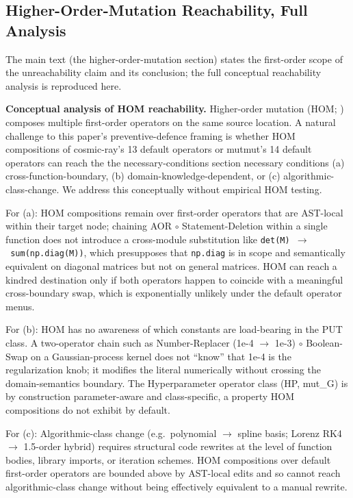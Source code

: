 \documentclass[manuscript,screen,review]{acmart}
\begin{document}
\subsection{Higher-Order-Mutation Reachability, Full Analysis}\label{k.3-hom-reachability}

The main text (the higher-order-mutation section) states the
first-order scope of the unreachability claim and its conclusion; the full
conceptual reachability analysis is reproduced here.

\textbf{Conceptual analysis of HOM reachability.} Higher-order mutation
(HOM; \citealp{jia2008subtle,jia2009hom,kintis2018effective}) composes multiple
first-order operators on the same source location. A natural challenge to this
paper's preventive-defence framing is whether HOM compositions of cosmic-ray's
13 default operators or mutmut's 14 default operators can reach the
the necessary-conditions section necessary
conditions (a) cross-function-boundary, (b) domain-knowledge-dependent, or (c)
algorithmic-class-change. We address this conceptually without empirical HOM
testing.

For (a): HOM compositions remain over first-order operators that are AST-local
within their target node; chaining AOR $\circ$ Statement-Deletion within a single
function does not introduce a cross-module substitution like
\texttt{det(M)\ $\to$\ sum(np.diag(M))}, which presupposes that \texttt{np.diag}
is in scope and semantically equivalent on diagonal matrices but not on general
matrices. HOM can reach a kindred destination only if both operators happen to
coincide with a meaningful cross-boundary swap, which is exponentially unlikely
under the default operator menus.

For (b): HOM has no awareness of which constants are load-bearing in the PUT
class. A two-operator chain such as Number-Replacer (1e-4 $\to$ 1e-3) $\circ$
Boolean-Swap on a Gaussian-process kernel does not ``know'' that 1e-4 is the
regularization knob; it modifies the literal numerically without crossing the
domain-semantics boundary. The Hyperparameter operator class (HP, mut\_G) is by
construction parameter-aware and class-specific, a property HOM compositions do
not exhibit by default.

For (c): Algorithmic-class change (e.g.~polynomial $\to$ spline basis;
Lorenz RK4 $\to$ 1.5-order hybrid) requires structural code rewrites at the level
of function bodies, library imports, or iteration schemes. HOM compositions over
default first-order operators are bounded above by AST-local edits and so cannot
reach algorithmic-class change without being effectively equivalent to a manual
rewrite.
\end{document}
